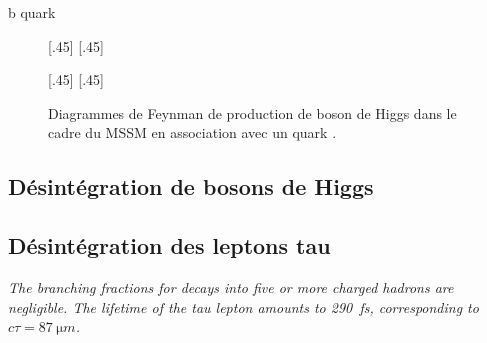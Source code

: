 b quark
\begin{figure}[h]
\centering
\vspace{\baselineskip}
\subcaptionbox{\label{subfig-fgraph-bb_hHA}}[.45\textwidth]
{\vspace{\baselineskip}}
\hfill
\subcaptionbox{\label{subfig-fgraph-Higgs_with_b_qq_g_bbh-MSSM}}[.45\textwidth]
{\vspace{\baselineskip}}

\vspace{2\baselineskip}
\subcaptionbox{\label{subfig-fgraph-gg_hHAbb}}[.45\textwidth]
{\vspace{\baselineskip}}
\hfill
\subcaptionbox{\label{subfig-fgraph-bg_b_bhHA}}[.45\textwidth]
{\vspace{\baselineskip}}

\caption[Production de boson de Higgs en association avec un quark \quarkb.]{Diagrammes de Feynman de production de boson de Higgs dans le cadre du MSSM en association avec un quark \quarkb.}
\label{fig-fgraph-Higgs_prod_with_b-MSSM}
\end{figure}




\subsection{Désintégration de bosons de Higgs}\label{chapter-MS-MSSM-section-pheno_Higgs_MSSM-subsec-desintegration_Higgs}



\subsection{Désintégration des leptons tau}\label{chapter-MS-MSSM-section-pheno_Higgs_MSSM-subsec-desintegration_lepton_tau}
\emph{The branching fractions for decays into five or more charged hadrons are negligible. The lifetime of the tau lepton amounts to \SI{290}{fs}, corresponding to $c\tau = \SI{87}{\micro m}$.}














